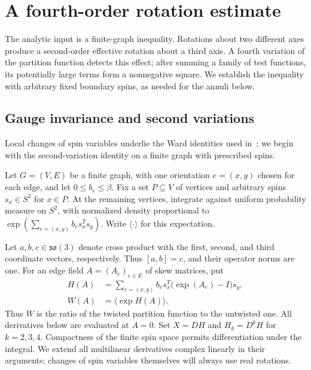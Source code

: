\section{A fourth-order rotation estimate}
\label{sec:rotation}

The analytic input is a finite-graph inequality. Rotations about two
different axes produce a second-order effective rotation about a third
axis. A fourth variation of the partition function detects this effect;
after summing a family of test functions, its potentially large terms
form a nonnegative square. We establish the inequality with arbitrary
fixed boundary spins, as needed for the annuli below.

\subsection{Gauge invariance and second variations}

Local changes of spin variables underlie the Ward identities used
in~\cite{DriesslerLandauPerez,AizenmanSimonWard}; we begin with the
second-variation identity on a finite graph with prescribed spins.

Let \(G=(V,E)\) be a finite graph, with one orientation \(e=(x,y)\)
chosen for each edge, and let \(0\le b_e\le\beta\). Fix a set
\(P\subseteq V\) of vertices and arbitrary spins \(s_x\in S^2\) for
\(x\in P\). At the remaining vertices, integrate against uniform
probability measure on \(S^2\), with normalized density proportional to
\(\exp(\sum_{e=(x,y)}b_e s_x^Ts_y)\). Write \(\langle\cdot\rangle\)
for this expectation.

Let \(a,b,c\in\mathfrak{so}(3)\) denote cross product with the first,
second, and third coordinate vectors, respectively. Thus
\([a,b]=c\), and their operator norms are one. For an edge field
\(A=(A_e)_{e\in E}\) of skew matrices, put
\begin{equation}
\label{eq:rotation-partition}
\begin{split}
H(A)&=\sum_{e=(x,y)}b_e s_x^T\bigl(\exp(A_e)-I\bigr)s_y,\\
W(A)&=\bigl\langle\exp H(A)\bigr\rangle.
\end{split}
\end{equation}
Thus \(W\) is the ratio of the twisted partition function to the
untwisted one. All derivatives below are evaluated at \(A=0\). Set
\(X=DH\) and \(H_k=D^kH\) for \(k=2,3,4\). Compactness of the
finite spin space permits differentiation under the integral. We extend
all multilinear derivatives complex linearly in their arguments; changes
of spin variables themselves will always use real rotations.

